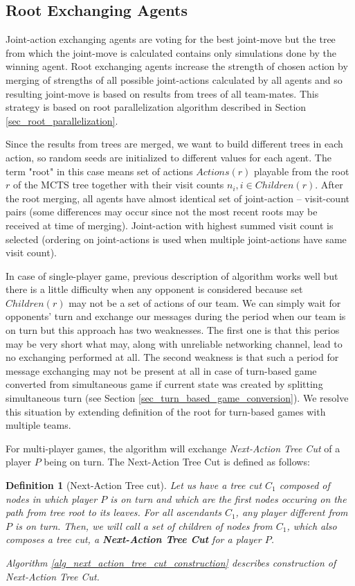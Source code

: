 \subsection{Root Exchanging Agents}

Joint-action exchanging agents are voting for the best joint-move but the tree from which the
joint-move is calculated contains only simulations done by the winning agent. Root exchanging
agents increase the strength of chosen action by merging of strengths of all possible 
joint-actions calculated by
all agents and so resulting joint-move is based on results from trees of all team-mates. This
strategy is based on root parallelization algorithm described in Section
\ref{sec_root_parallelization}.

Since the results from trees are merged, we want to build different trees in each action, so 
random seeds
are initialized to different values for each agent. The term "root" in this case means set of
actions $Actions(r)$ playable from the root $r$ of the MCTS tree together with their visit
counts $n_i, i \in Children(r)$. After the root merging, all agents have almost identical
set of joint-action -- visit-count pairs (some differences may occur since not the most recent roots
may be received at time of merging). Joint-action with highest summed visit count is
selected (ordering on joint-actions is used when multiple joint-actions have same visit count).

In case of single-player game, previous description of algorithm works well but there is a little
difficulty when any opponent is considered because set $Children(r)$ may not be a set of actions of
our team. We can simply wait for opponents' turn and exchange our messages during the period
when our team is on turn but this approach has two weaknesses. The first one is that this
perios may be very short what may, along with unreliable networking channel, lead to no
exchanging performed at all. The second weakness is that such a period for message
exchanging may not be present at all in case of turn-based game converted from simultaneous
game if current state was created by splitting simultaneous turn (see Section 
\ref{sec_turn_based_game_conversion}). We resolve this situation by extending definition of the
root for turn-based games with multiple teams. 

For multi-player games, the algorithm will exchange \emph{Next-Action Tree Cut} of a player $P$
being on turn. The Next-Action Tree Cut is defined as follows:

\newtheorem*{defnextactiontreecut}{Definition}
\begin{defnextactiontreecut}[Next-Action Tree cut]
Let us have a tree cut $C_1$ composed of nodes in which player $P$ is on turn and which are the first
nodes occuring on the path from tree root to its leaves. For all ascendants $C_1$, any player
different from $P$ is on turn. Then, we will call a set of children of nodes from $C_1$, which
also composes a tree cut, a \textbf{Next-Action Tree Cut} for a player $P$.

Algorithm \ref{alg_next_action_tree_cut_construction} describes construction of Next-Action
Tree Cut.

\end{defnextactiontreecut}

